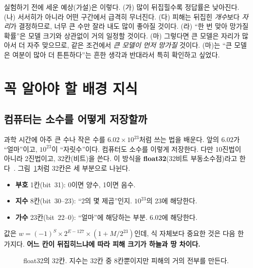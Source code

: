 \documentclass[11pt,a4paper]{article}
\begin{document}
실험하기 전에 세운 예상(가설)은 이렇다. (가) 많이 뒤집힐수록 정답률은 낮아진다. (나) 서서히가 아니라 어떤 구간에서 급격히 무너진다. (다) 피해는 뒤집힌 \emph{개수}보다 \emph{자리}가 결정하므로, 너무 큰 수만 잘라 내도 많이 좋아질 것이다. (라) ``한 번 맞아 망가질 확률''은 모델 크기와 상관없이 거의 일정할 것이다. (마) 그렇다면 큰 모델은 자리가 많아서 더 자주 맞으므로, 같은 조건에서 \emph{큰 모델이 먼저 망가질} 것이다. (마)는 ``큰 모델은 여분이 많아 더 튼튼하다''는 흔한 생각과 반대라서 특히 확인하고 싶었다.

\section{꼭 알아야 할 배경 지식}

\subsection{컴퓨터는 소수를 어떻게 저장할까}
과학 시간에 아주 큰 수나 작은 수를 $6.02\times10^{23}$처럼 쓰는 법을 배운다. 앞의 $6.02$가 ``얼마''이고, $10^{23}$이 ``자릿수''이다. 컴퓨터도 소수를 이렇게 저장한다. 다만 10진법이 아니라 2진법이고, 32칸(비트)을 쓴다. 이 방식을 \textbf{float32}(32비트 부동소수점)라고 한다~\citep{ieee754}. 그림~\ref{fig:float32}처럼 32칸은 세 부분으로 나뉜다.
\begin{itemize}[leftmargin=*,nosep]
  \item \textbf{부호} 1칸(bit~31): 0이면 양수, 1이면 음수.
  \item \textbf{지수} 8칸(bit~30--23): ``$2$의 몇 제곱''인지. $10^{23}$의 23에 해당한다.
  \item \textbf{가수} 23칸(bit~22--0): ``얼마''에 해당하는 부분. $6.02$에 해당한다.
\end{itemize}
값은 $w=(-1)^{S}\times2^{E-127}\times(1+M/2^{23})$인데, 식 자체보다 중요한 것은 다음 한 가지다. \textbf{어느 칸이 뒤집히느냐에 따라 피해 크기가 하늘과 땅 차이다.}

\begin{figure}[H]
  \centering
  \caption{float32의 32칸. 지수는 32칸 중 8칸뿐이지만 피해의 거의 전부를 만든다.}
  \label{fig:float32}
\end{figure}
\end{document}

